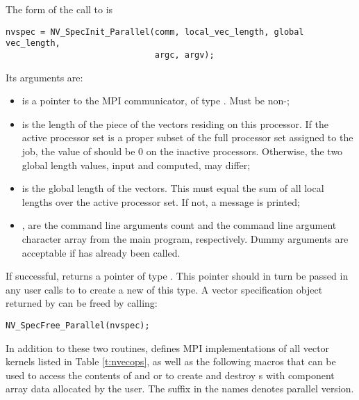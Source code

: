 \noindent The form of the call to  is
\begin{verbatim}
nvspec = NV_SpecInit_Parallel(comm, local_vec_length, global vec_length,
                              argc, argv);
\end{verbatim}
Its arguments are:
\begin{itemize}
\item {} is a pointer to the MPI communicator, of type .
  Must be non-;
\item {} is the length of the piece of the vectors
  residing on this processor. If the active processor set is a proper
  subset of the full processor set assigned to the job, the value of 
  should be 0 on the inactive processors. Otherwise, the two global length values,
  input and computed, may differ;
\item {} is the global length of the vectors.
  This must equal the sum of all local lengths over the active processor set.
  If not, a message is printed;
\item {},  are the command line arguments count
  and the command line argument character array from the main program,
  respectively. Dummy arguments are acceptable if  has
  already been called.
\end{itemize}
If successful,  returns a pointer of type
. This pointer should in turn be passed in any user
calls to  to create a new  of this type.
A vector specification object  returned by 
can be freed by calling:
\begin{verbatim}
NV_SpecFree_Parallel(nvspec);
\end{verbatim}
In addition to these two routines, {\nvecp} defines MPI implementations of all 
vector kernels listed in Table \ref{t:nvecops}, as well as the following macros
that can be used to access the contents of  and 
or to create and destroy s with component array data allocated
by the user. The suffix  in the names denotes parallel version.

